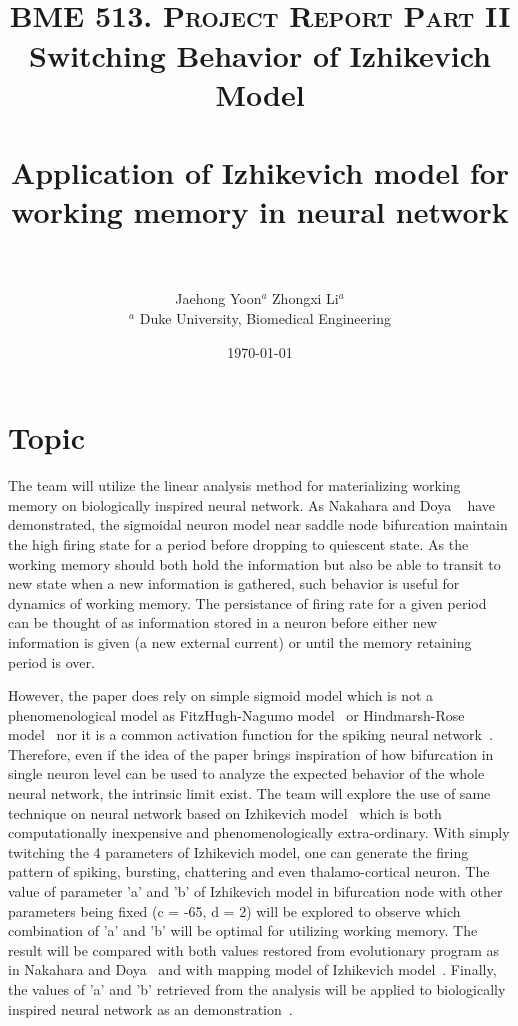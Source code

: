 \documentclass[paper=a4, fontsize=11pt]{article} %
\title{	
\normalfont \normalsize 
\horrule{0.5pt} \\[0.4cm] %
\textsc{\normalsize BME 513. Project Report Part II } \\
\huge Switching Behavior of Izhikevich Model \\ %
\huge $\:$ \\
\large Application of Izhikevich model for working memory in neural network \\ %
\horrule{2pt} \\[0.5cm] %
}
\author{Jaehong Yoon$^a$ Zhongxi Li$^a$\\
\normalsize $^a$ Duke University, Biomedical Engineering\\ [25pt] %
} %
\date{\normalsize\today} %
\numberwithin{equation}{section} %
\numberwithin{table}{section} %
\begin{document}
\maketitle %


\section*{Topic} 

The team will utilize the linear analysis method for materializing working memory on biologically inspired neural network. As Nakahara and Doya ~\cite{nakahara1998near} have demonstrated, the sigmoidal neuron model near saddle node bifurcation maintain the high firing state for a period before dropping to quiescent state. As the working memory should both hold the information but also be able to transit to new state when a new information is gathered, such behavior is useful for dynamics of working memory. The persistance of firing rate for a given period can be thought of as information stored in a neuron before either new information is given (a new external current) or until the memory retaining period is over.

However, the paper does rely on simple sigmoid model which is not a phenomenological model as FitzHugh-Nagumo model~\cite{Izhikevich:2006} or Hindmarsh-Rose model~\cite{hindmarsh1984model} nor it is a common activation function for the spiking neural network~\cite{maass1997networks}. Therefore, even if the idea of the paper brings inspiration of how bifurcation in single neuron level can be used to analyze the expected behavior of the whole neural network, the intrinsic limit exist. The team will explore the use of same technique on neural network based on Izhikevich model~\cite{izhikevich2003simple} which is both computationally inexpensive and phenomenologically extra-ordinary. With simply twitching the 4 parameters of Izhikevich model, one can generate the firing pattern of spiking, bursting, chattering and even thalamo-cortical neuron. The value of parameter 'a' and 'b' of Izhikevich model in bifurcation node with other parameters being fixed (c = -65, d = 2) will be explored to observe which combination of 'a' and 'b' will be optimal for utilizing working memory. The result will be compared with both values restored from evolutionary program as in  Nakahara and Doya~\cite{nakahara1998near} and with mapping model of Izhikevich model~\cite{moehlis2008dynamical}. Finally, the values of 'a' and 'b' retrieved from the analysis will be applied to biologically inspired neural network as an demonstration~\cite{braitenberg1986vehicles, french2005introducing}.
\end{document}
